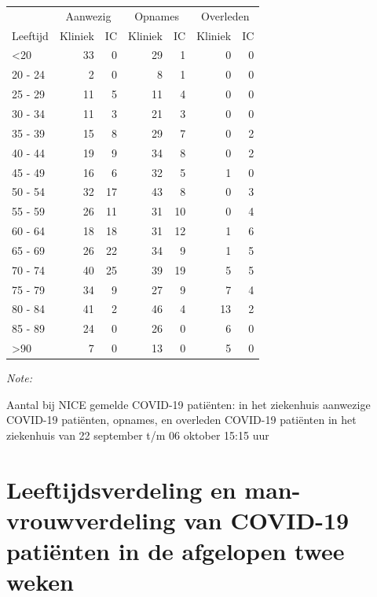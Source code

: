 \documentclass[
  english,
  man,floatsintext]{apa6}
\begin{document}
\begin{table}
\centering\begingroup\fontsize{10}{12}\selectfont

\begin{threeparttable}
\begin{tabular}{lrrrrrr}
\toprule
\multicolumn{1}{c}{ } & \multicolumn{2}{c}{Aanwezig} & \multicolumn{2}{c}{Opnames} & \multicolumn{2}{c}{Overleden} \\
\cmidrule(l{3pt}r{3pt}){2-3} \cmidrule(l{3pt}r{3pt}){4-5} \cmidrule(l{3pt}r{3pt}){6-7}
Leeftijd & Kliniek & IC & Kliniek & IC & Kliniek & IC\\
\midrule
<20 & 33 & 0 & 29 & 1 & 0 & 0\\
20 - 24 & 2 & 0 & 8 & 1 & 0 & 0\\
25 - 29 & 11 & 5 & 11 & 4 & 0 & 0\\
30 - 34 & 11 & 3 & 21 & 3 & 0 & 0\\
35 - 39 & 15 & 8 & 29 & 7 & 0 & 2\\
40 - 44 & 19 & 9 & 34 & 8 & 0 & 2\\
45 - 49 & 16 & 6 & 32 & 5 & 1 & 0\\
50 - 54 & 32 & 17 & 43 & 8 & 0 & 3\\
55 - 59 & 26 & 11 & 31 & 10 & 0 & 4\\
60 - 64 & 18 & 18 & 31 & 12 & 1 & 6\\
65 - 69 & 26 & 22 & 34 & 9 & 1 & 5\\
70 - 74 & 40 & 25 & 39 & 19 & 5 & 5\\
75 - 79 & 34 & 9 & 27 & 9 & 7 & 4\\
80 - 84 & 41 & 2 & 46 & 4 & 13 & 2\\
85 - 89 & 24 & 0 & 26 & 0 & 6 & 0\\
>90 & 7 & 0 & 13 & 0 & 5 & 0\\
\bottomrule
\end{tabular}
\begin{tablenotes}
\item \textit{Note: } 
\item Aantal bij NICE gemelde COVID-19 patiënten: in het ziekenhuis aanwezige COVID-19 patiënten, opnames, en overleden COVID-19 patiënten in het ziekenhuis van 22 september t/m 06 oktober 15:15 uur
\end{tablenotes}
\end{threeparttable}
\endgroup{}
\end{table}

\newpage

\hypertarget{leeftijdsverdeling-en-man-vrouwverdeling-van-covid-19-patiuxebnten-in-de-afgelopen-twee-weken}{%
\section{Leeftijdsverdeling en man-vrouwverdeling van COVID-19 patiënten in de afgelopen twee weken}\label{leeftijdsverdeling-en-man-vrouwverdeling-van-covid-19-patiuxebnten-in-de-afgelopen-twee-weken}}
\end{document}
